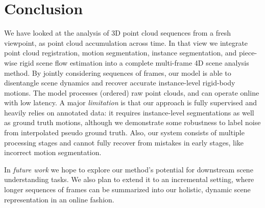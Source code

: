 \section{Conclusion}
\label{sec: conclusions}
We have looked at the analysis of 3D point cloud sequences from a fresh viewpoint, as point cloud accumulation across time. In that view we integrate point cloud registration, motion segmentation, instance segmentation, and piece-wise rigid scene flow estimation into a complete multi-frame 4D scene analysis method. By jointly considering sequences of frames, our model is able to disentangle scene dynamics and recover accurate instance-level rigid-body motions. The model processes (ordered) raw point clouds, and can operate online with low latency. A major \emph{limitation} is that our approach is fully supervised and heavily relies on annotated data: it requires instance-level segmentations as well as ground truth motions, although we demonstrate some robustness to label noise from interpolated pseudo ground truth. Also, our system consists of multiple processing stages and cannot fully recover from mistakes in early stages, like incorrect motion segmentation. 

In \emph{future work} we hope to explore our method's potential for downstream scene understanding tasks. We also plan to extend it to an incremental setting, where longer sequences of frames can be summarized into our holistic, dynamic scene representation in an online fashion.